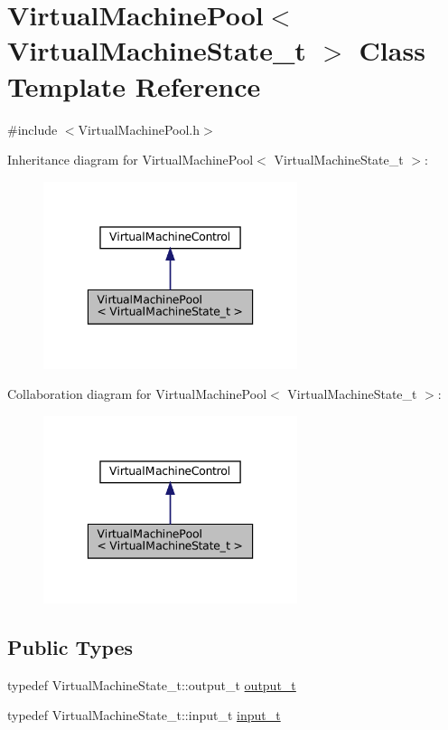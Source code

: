 \hypertarget{class_virtual_machine_pool}{}\section{Virtual\+Machine\+Pool$<$ Virtual\+Machine\+State\+\_\+t $>$ Class Template Reference}
\label{class_virtual_machine_pool}


{\ttfamily \#include $<$Virtual\+Machine\+Pool.\+h$>$}



Inheritance diagram for Virtual\+Machine\+Pool$<$ Virtual\+Machine\+State\+\_\+t $>$\+:
\nopagebreak
\begin{figure}[H]
\begin{center}
\leavevmode
\includegraphics[width=211pt]{class_virtual_machine_pool__inherit__graph}
\end{center}
\end{figure}


Collaboration diagram for Virtual\+Machine\+Pool$<$ Virtual\+Machine\+State\+\_\+t $>$\+:
\nopagebreak
\begin{figure}[H]
\begin{center}
\leavevmode
\includegraphics[width=211pt]{class_virtual_machine_pool__coll__graph}
\end{center}
\end{figure}
\subsection*{Public Types}
\begin{DoxyCompactItemize}
\item 
typedef Virtual\+Machine\+State\+\_\+t\+::output\+\_\+t \hyperlink{class_virtual_machine_pool_a1e659e76790f4aa4ae074d82a8c381e1}{output\+\_\+t}
\item 
typedef Virtual\+Machine\+State\+\_\+t\+::input\+\_\+t \hyperlink{class_virtual_machine_pool_a8cbea2d216d16e9d23e074457b2997a0}{input\+\_\+t}
\end{DoxyCompactItemize}
